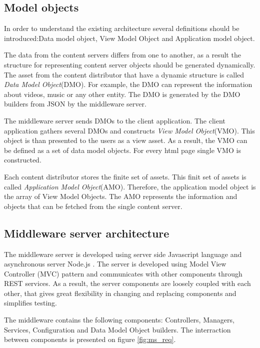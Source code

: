\subsection{Model objects}

In order to understand the existing architecture several definitions should be introduced:Data model object, View Model Object and Application model object.

The data from the content servers differs from one to another, as a result the structure for representing content server objects should be generated dynamically. The asset from the content distributor that have a dynamic structure is called \textit{Data Model Object}(DMO). For example, the DMO can represent the information about videos, music or any other entity. The DMO is generated by the DMO builders from JSON by the middleware server.

The middleware server sends DMOs to the client application. The client application gathers several DMOs and constructs \textit{View Model Object}(VMO). This object is than presented to the users as a view asset. As a result, the VMO can be defined as a set of data model objects. For every html page single VMO is constructed. 

Each content distributor stores the finite set of assets. This finit set of assets is called \textit{Application Model Object}(AMO). Therefore, the application model object is the array of View Model Objects. The AMO represents the information and objects that can be fetched from the single content server.


\subsection{Middleware server architecture}

The middleware server is developed using server side Javascript language and asynchronous server Node.js \cite{Nodejs}. The server is developed using Model View Controller (MVC) pattern and communicates with other components through REST services. As a result, the server components are loosely coupled with each other, that gives great flexibility in changing and replacing components and simplifies testing. 

The middleware contains the following components: Controllers, Managers, Services, Configuration and Data Model Object builders. The interraction between components is presented on figure \ref{fig:ms_req}.

